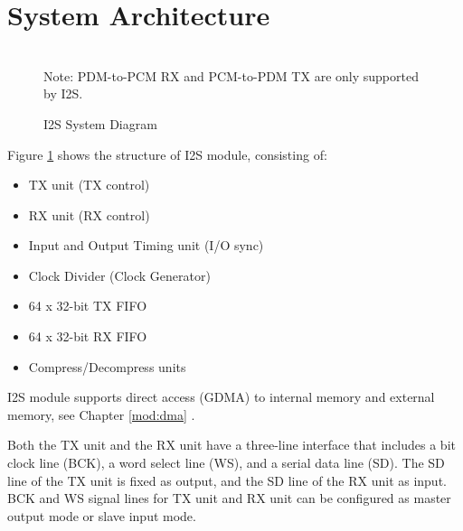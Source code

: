 \documentclass[main\_\_CN.tex]{subfiles}
\begin{document}
\section{System Architecture}
\begin{figure}[H]
    \centering
    \\
    Note: PDM-to-PCM RX and PCM-to-PDM TX are only supported by I2S.
    \caption{\chipname{} I2S System Diagram}
    \label{Figure:i2s_arch}
\end{figure}

Figure  \ref{Figure:i2s_arch} shows the structure of  \chipname{} I2S module, consisting of:
\begin{itemize}
    \item TX unit (TX control)
    \item RX unit (RX control)
    \item Input and Output Timing unit (I/O sync)
    \item Clock Divider (Clock Generator)
    \item 64 x 32-bit TX FIFO
    \item 64 x 32-bit RX FIFO
    \item Compress/Decompress units
\end{itemize}
\chipname{} I2S module supports direct access (GDMA) to internal memory and external memory, see Chapter  \ref{mod:dma} \textit{}.


Both the TX unit and the RX unit have a three-line interface that includes a bit clock line (BCK), a word select line (WS), and a serial data line (SD). The SD line of the TX unit is fixed as output, and the SD line of the RX unit as input. BCK and WS signal lines for TX unit and RX unit can be configured as master output mode or slave input mode.
\end{document}
